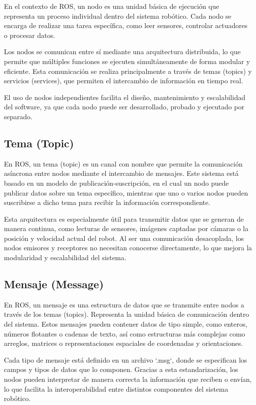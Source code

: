 En el contexto de ROS, un nodo es una unidad básica de ejecución que representa un proceso individual dentro del sistema robótico. Cada nodo se encarga de realizar una tarea específica, como leer sensores, controlar actuadores o procesar datos.

Los nodos se comunican entre sí mediante una arquitectura distribuida, lo que permite que múltiples funciones se ejecuten simultáneamente de forma modular y eficiente. Esta comunicación se realiza principalmente a través de temas (topics) y servicios (services), que permiten el intercambio de información en tiempo real.

El uso de nodos independientes facilita el diseño, mantenimiento y escalabilidad del software, ya que cada nodo puede ser desarrollado, probado y ejecutado por separado.

\subsection{Tema (Topic)}

En ROS, un tema (topic) es un canal con nombre que permite la comunicación asíncrona entre nodos mediante el intercambio de mensajes. Este sistema está basado en un modelo de publicación-suscripción, en el cual un nodo puede publicar datos sobre un tema específico, mientras que uno o varios nodos pueden suscribirse a dicho tema para recibir la información correspondiente.

Esta arquitectura es especialmente útil para transmitir datos que se generan de manera continua, como lecturas de sensores, imágenes captadas por cámaras o la posición y velocidad actual del robot. Al ser una comunicación desacoplada, los nodos emisores y receptores no necesitan conocerse directamente, lo que mejora la modularidad y escalabilidad del sistema.

\subsection{Mensaje (Message)}

En ROS, un mensaje es una estructura de datos que se transmite entre nodos a través de los temas (topics). Representa la unidad básica de comunicación dentro del sistema. Estos mensajes pueden contener datos de tipo simple, como enteros, números flotantes o cadenas de texto, así como estructuras más complejas como arreglos, matrices o representaciones espaciales de coordenadas y orientaciones.

Cada tipo de mensaje está definido en un archivo `.msg`, donde se especifican los campos y tipos de datos que lo componen. Gracias a esta estandarización, los nodos pueden interpretar de manera correcta la información que reciben o envían, lo que facilita la interoperabilidad entre distintos componentes del sistema robótico.

